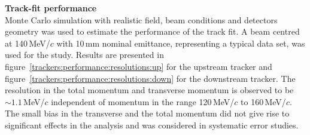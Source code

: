\noindent\textbf{Track-fit performance} \\
\noindent
Monte Carlo simulation with realistic field, beam conditions and detectors geometry was used to estimate the performance of the track fit.
A beam centred at 140\,MeV/$c$ with 10\,mm nominal emittance,
representing a typical data set, was used for the study.
Results are presented in
figure~\ref{trackers:performance:resolutions:up} for the upstream
tracker and figure~\ref{trackers:performance:resolutions:down} for the
downstream tracker.
The resolution in the total momentum and transverse momentum is
observed to be $\sim1.1$\,MeV/$c$ independent of momentum in the range
120\,MeV/$c$ to 160\,MeV/$c$.
The small bias in the transverse and the total momentum did not give rise to significant effects in the analysis and was considered in systematic error studies.
